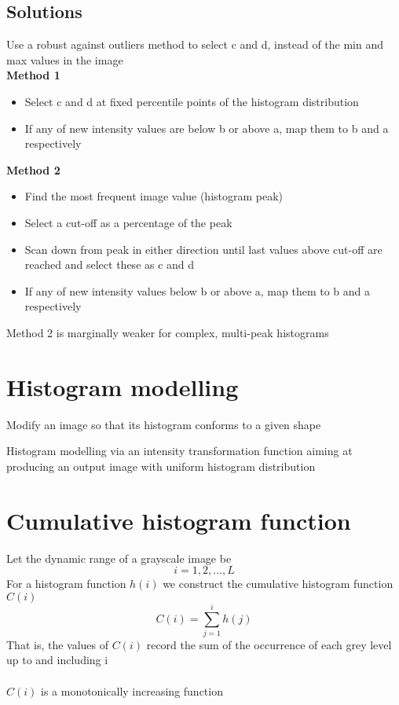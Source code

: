 \documentclass{article}[18pt]
\begin{document}
\subsection{Solutions}
Use a robust against outliers method to select c and d, instead of the min and max values in the image\\
\textbf{Method 1}
\begin{itemize}
	\item Select c and d at fixed percentile points of the histogram distribution
	\item If any of new intensity values are below b or above a, map them to b and a respectively
\end{itemize}
\textbf{Method 2}
\begin{itemize}
	\item Find the most frequent image value (histogram peak)
	\item Select a cut-off as a percentage of the peak
	\item Scan down from peak in either direction until last values above cut-off are reached and select these as c and d
	\item If any of new intensity values below b or above a, map them to b and a respectively
\end{itemize}
Method 2 is marginally weaker for complex, multi-peak histograms
\section{Histogram modelling}
\begin{defin}
Modify an image so that its histogram conforms to a given shape
\end{defin}
\begin{defin}
Histogram modelling via an intensity transformation function aiming at producing an output image with uniform histogram distribution
\end{defin}
\section{Cumulative histogram function}
Let the dynamic range of a grayscale image be
$$i=1,2,...,L$$
For a histogram function $h(i)$ we construct the cumulative histogram function $C(i)$
$$C(i)=\sum_{j=1}^{i}h(j)$$
That is, the values of $C(i)$ record the sum of the occurrence of each grey level up to and including i\\
\\
$C(i)$ is a monotonically increasing function
\end{document}
